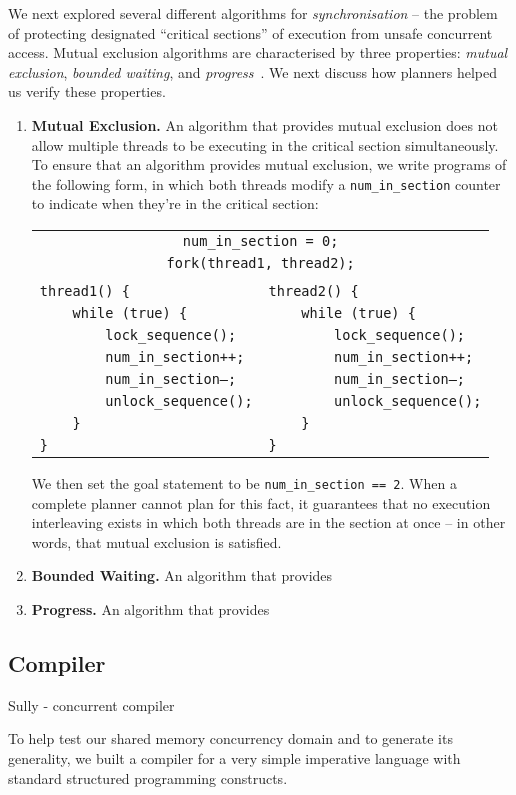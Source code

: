 We next explored several different algorithms for {\em synchronisation} -- the problem of protecting designated ``critical sections'' of execution from unsafe concurrent access. Mutual exclusion algorithms are characterised by three properties: {\em mutual exclusion}, {\em bounded waiting}, and {\em progress}~\cite{de0u}. We next discuss how planners helped us verify these properties.

\begin{enumerate}
	\item {\bf Mutual Exclusion.} An algorithm that provides mutual exclusion does not allow multiple threads to be executing in the critical section simultaneously.
	To ensure that an algorithm provides mutual exclusion, we write programs of the following form, in which both threads modify a \texttt{num\_in\_section} counter to indicate when they're in the critical section:
	\begin{center}
	\begin{tabular}{ll}
	\multicolumn{2}{c}{\texttt{num\_in\_section = 0;}} \\
	\multicolumn{2}{c}{\texttt{fork(thread1, thread2);}} \\
	& \\
	\texttt{thread1() \{} & \texttt{thread2() \{} \\
	\texttt{~~~~while (true) \{} & \texttt{~~~~while (true) \{} \\
	\texttt{~~~~~~~~lock\_sequence();} & \texttt{~~~~~~~~lock\_sequence();} \\
	\texttt{~~~~~~~~num\_in\_section++;} & \texttt{~~~~~~~~num\_in\_section++;} \\
	\texttt{~~~~~~~~num\_in\_section--;} & \texttt{~~~~~~~~num\_in\_section--;} \\
	\texttt{~~~~~~~~unlock\_sequence();\qquad} & \texttt{~~~~~~~~unlock\_sequence();} \\
	\texttt{~~~~\}} & \texttt{~~~~\}} \\
	\texttt{\}} & \texttt{\}} \\
	\end{tabular}
	\end{center}
	We then set the goal statement to be \texttt{num\_in\_section == 2}. When a complete planner cannot plan for this fact, it guarantees that no execution interleaving exists in which both threads are in the section at once -- in other words, that mutual exclusion is satisfied.
	\item {\bf Bounded Waiting.} An algorithm that provides
	\item {\bf Progress.} An algorithm that provides
\end{enumerate}

\subsection{Compiler}
Sully - concurrent compiler


To help test our shared memory concurrency domain and to generate its
generality, we built a compiler for a very simple imperative language
with standard structured programming constructs.
